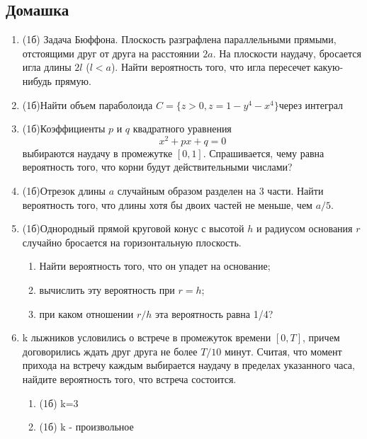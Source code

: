 \documentclass[a4paper, 14pt]{extarticle}
\begin{document}
\subsection*{Домашка}
\begin{enumerate}
	\item (1б) Задача Бюффона. Плоскость разграфлена параллельными
	прямыми, отстоящими друг от друга на расстоянии $2a$. На плоскости
	наудачу, бросается игла длины $2l$ ($l<a$). Найти вероятность того, что
	игла пересечет какую-нибудь прямую.
    \item (1б)Найти объем параболоида $C = \{z>0,z = 1-y^4-x^4\}$через интеграл
    \item (1б)Коэффициенты $p$ и $q$ квадратного уравнения
	$$x^2 + px + q = 0$$
	выбираются наудачу в промежутке $[0,1]$. Спрашивается, чему равна 
	вероятность того, что корни будут действительными числами?
	
	\item (1б)Отрезок длины $a$ случайным образом разделен на 3 части. Найти вероятность того, 
	что длины хотя бы двоих частей не меньше, чем $a/5$.
	\item (1б)Однородный прямой круговой конус с 
	высотой $h$ и радиусом основания $r$ случайно бросается на
	горизонтальную плоскость.
	\begin{enumerate}
		\item Найти вероятность того,
	что он упадет на основание; 
		\item вычислить эту 
	вероятность при $r=h$; 
	\item при каком отношении $r/h$ эта 
	вероятность равна 1/4?
	\end{enumerate}
	\item k лыжников условились о встрече в промежуток времени $[0,T]$, причем договорились
	ждать друг друга не более $T/10$ минут. Считая, что
	момент прихода на встречу каждым выбирается наудачу в пределах
	указанного часа, найдите вероятность того, что встреча состоится.
	\begin{enumerate}
	    \item (1б) k=3
	    \item (1б) k - произвольное
	\end{enumerate}
\end{enumerate}
	
\end{document}
